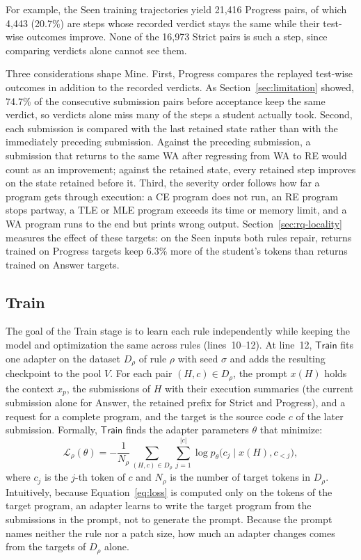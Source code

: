 \documentclass[10pt,conference]{IEEEtran}
\begin{document}
For example, the Seen training trajectories yield 21,416 Progress pairs, of which 4,443 (20.7\%) are steps whose recorded verdict stays the same while their test-wise outcomes improve. None of the 16,973 Strict pairs is such a step, since comparing verdicts alone cannot see them.

Three considerations shape Mine. First, Progress compares the replayed test-wise outcomes in addition to the recorded verdicts. As Section~\ref{sec:limitation} showed, 74.7\% of the consecutive submission pairs before acceptance keep the same verdict, so verdicts alone miss many of the steps a student actually took. Second, each submission is compared with the last retained state rather than with the immediately preceding submission. Against the preceding submission, a submission that returns to the same WA after regressing from WA to RE would count as an improvement; against the retained state, every retained step improves on the state retained before it. Third, the severity order follows how far a program gets through execution: a CE program does not run, an RE program stops partway, a TLE or MLE program exceeds its time or memory limit, and a WA program runs to the end but prints wrong output. Section~\ref{sec:rq-locality} measures the effect of these targets: on the Seen inputs both rules repair, returns trained on Progress targets keep 6.3\% more of the student's tokens than returns trained on Answer targets.

\subsection{Train}
\label{sec:train}
The goal of the Train stage is to learn each rule independently while keeping the model and optimization the same across rules (lines~10--12). At line~12, \(\mathsf{Train}\) fits one adapter on the dataset \(D_\rho\) of rule \(\rho\) with seed \(\sigma\) and adds the resulting checkpoint to the pool \(V\). For each pair \((H,c)\in D_\rho\), the prompt \(x(H)\) holds the context \(x_p\), the submissions of \(H\) with their execution summaries (the current submission alone for Answer, the retained prefix for Strict and Progress), and a request for a complete program, and the target is the source code \(c\) of the later submission. Formally, \(\mathsf{Train}\) finds the adapter parameters \(\theta\) that minimize:
\begin{equation}
 \mathcal L_\rho(\theta)=-\frac{1}{N_\rho}\sum_{(H,c)\in D_\rho}\sum_{j=1}^{|c|}\log p_\theta\bigl(c_j\mid x(H),c_{<j}\bigr),
\label{eq:loss}
\end{equation}
where \(c_j\) is the \(j\)-th token of \(c\) and \(N_\rho\) is the number of target tokens in \(D_\rho\). Intuitively, because Equation~\eqref{eq:loss} is computed only on the tokens of the target program, an adapter learns to write the target program from the submissions in the prompt, not to generate the prompt. Because the prompt names neither the rule nor a patch size, how much an adapter changes comes from the targets of \(D_\rho\) alone.
\end{document}
